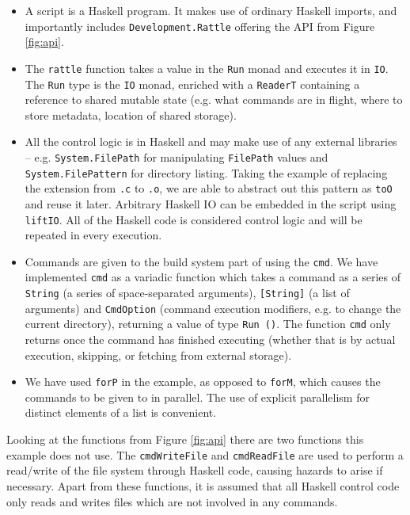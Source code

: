 \begin{itemize}
\item A \Rattle script is a Haskell program. It makes use of ordinary Haskell imports, and importantly includes \texttt{Development.Rattle} offering the API from Figure \ref{fig:api}.
\item The \texttt{rattle} function takes a value in the \texttt{Run} monad and executes it in \texttt{IO}. The \texttt{Run} type is the \texttt{IO} monad, enriched with a \texttt{ReaderT} containing a reference to shared mutable state (e.g. what commands are in flight, where to store metadata, location of shared storage).
\item All the control logic is in Haskell and may make use of any external libraries -- e.g. \texttt{System.FilePath} for manipulating \texttt{FilePath} values and \texttt{System.FilePattern} for directory listing. Taking the example of replacing the extension from \texttt{.c} to \texttt{.o}, we are able to abstract out this pattern as \texttt{toO} and reuse it later. Arbitrary Haskell IO can be embedded in the script using \texttt{liftIO}. All of the Haskell code is considered control logic and will be repeated in every execution.
\item Commands are given to the build system part of \Rattle using the \texttt{cmd}. We have implemented \texttt{cmd} as a variadic function \cite{variadic_functions} which takes a command as a series of \texttt{String} (a series of space-separated arguments), \texttt{[String]} (a list of arguments) and \texttt{CmdOption} (command execution modifiers, e.g. to change the current directory), returning a value of type \texttt{Run ()}. The function \texttt{cmd} only returns once the command has finished executing (whether that is by actual execution, skipping, or fetching from external storage).
\item We have used \texttt{forP} in the example, as opposed to \texttt{forM}, which causes the commands to be given to \Rattle in parallel. The use of explicit parallelism for distinct elements of a list is convenient.
\end{itemize}

Looking at the functions from Figure \ref{fig:api} there are two functions this example does not use. The \texttt{cmdWriteFile} and \texttt{cmdReadFile} are used to perform a read/write of the file system through Haskell code, causing hazards to arise if necessary. Apart from these functions, it is assumed that all Haskell control code only reads and writes files which are not involved in any commands.

